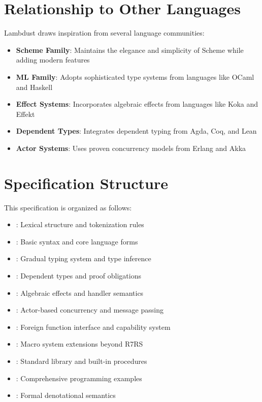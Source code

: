 \section{Relationship to Other Languages}
\label{subsec:related}

Lambdust draws inspiration from several language communities:

\begin{itemize}
\item \textbf{Scheme Family}: Maintains the elegance and simplicity of Scheme while adding modern features
\item \textbf{ML Family}: Adopts sophisticated type systems from languages like OCaml and Haskell  
\item \textbf{Effect Systems}: Incorporates algebraic effects from languages like Koka and Effekt
\item \textbf{Dependent Types}: Integrates dependent typing from Agda, Coq, and Lean
\item \textbf{Actor Systems}: Uses proven concurrency models from Erlang and Akka
\end{itemize}

\section{Specification Structure}
\label{subsec:structure}

This specification is organized as follows:

\begin{itemize}
\item {}: Lexical structure and tokenization rules
\item {}: Basic syntax and core language forms  
\item {}: Gradual typing system and type inference
\item {}: Dependent types and proof obligations
\item {}: Algebraic effects and handler semantics
\item {}: Actor-based concurrency and message passing
\item {}: Foreign function interface and capability system
\item {}: Macro system extensions beyond R7RS
\item {}: Standard library and built-in procedures
\item {}: Comprehensive programming examples
\item {}: Formal denotational semantics
\end{itemize}

